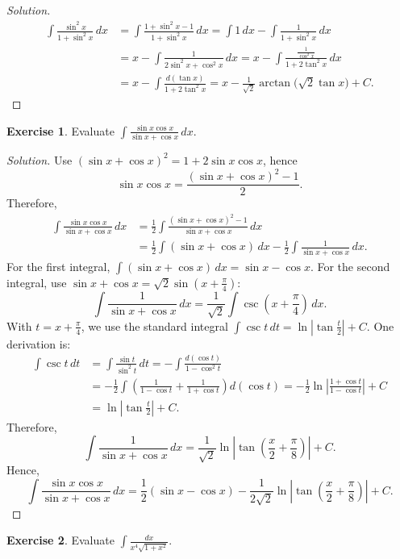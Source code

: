 \documentclass[11pt]{article}
\theoremstyle{definition}
\newtheorem{exercise}{Exercise}[section]
\newenvironment{solution}{\begin{proof}[Solution]}{\end{proof}}
\begin{document}
\begin{solution}
\begin{align*}
\int\frac{\sin^2 x}{1+\sin^2 x}\,dx
&=\int\frac{1+\sin^2 x-1}{1+\sin^2 x}\,dx
=\int 1\,dx-\int\frac{1}{1+\sin^2 x}\,dx \\
&=x-\int\frac{1}{2\sin^2 x+\cos^2 x}\,dx
=x-\int\frac{\frac{1}{\cos^2 x}}{1+2\tan^2 x}\,dx \\
&=x-\int\frac{d(\tan x)}{1+2\tan^2 x}
=x-\frac{1}{\sqrt{2}}\arctan\!\bigl(\sqrt{2}\tan x\bigr)+C.
\end{align*}
\end{solution}

\begin{exercise}
Evaluate $\displaystyle \int \frac{\sin x\cos x}{\sin x+\cos x}\,dx$.
\end{exercise}

\begin{solution}
Use $(\sin x+\cos x)^2=1+2\sin x\cos x$, hence
\[
\sin x\cos x=\frac{(\sin x+\cos x)^2-1}{2}.
\]
Therefore,
\begin{align*}
\int \frac{\sin x\cos x}{\sin x+\cos x}\,dx
&=\frac{1}{2}\int\frac{(\sin x+\cos x)^2-1}{\sin x+\cos x}\,dx \\
&=\frac{1}{2}\int(\sin x+\cos x)\,dx-\frac{1}{2}\int\frac{1}{\sin x+\cos x}\,dx.
\end{align*}
For the first integral, $\int(\sin x+\cos x)\,dx=\sin x-\cos x$.
For the second integral, use $\sin x+\cos x=\sqrt{2}\sin(x+\frac{\pi}{4})$:
\[
\int\frac{1}{\sin x+\cos x}\,dx
=\frac{1}{\sqrt{2}}\int \csc\!\left(x+\frac{\pi}{4}\right)\,dx.
\]
With $t=x+\frac{\pi}{4}$, we use the standard integral $\int \csc t\,dt=\ln\left|\tan\frac{t}{2}\right|+C$. One derivation is:
\begin{align*}
\int \csc t\,dt
&=\int \frac{\sin t}{\sin^2 t}\,dt
=-\int \frac{d(\cos t)}{1-\cos^2 t} \\
&=-\frac{1}{2}\int\left(\frac{1}{1-\cos t}+\frac{1}{1+\cos t}\right)d(\cos t)
=-\frac{1}{2}\ln\left|\frac{1+\cos t}{1-\cos t}\right|+C \\
&=\ln\left|\tan\frac{t}{2}\right|+C.
\end{align*}
Therefore,
\[
\int\frac{1}{\sin x+\cos x}\,dx
=\frac{1}{\sqrt{2}}\ln\left|\tan\left(\frac{x}{2}+\frac{\pi}{8}\right)\right|+C.
\]
Hence,
\[
\int \frac{\sin x\cos x}{\sin x+\cos x}\,dx
=\frac{1}{2}(\sin x-\cos x)-\frac{1}{2\sqrt{2}}\ln\left|\tan\left(\frac{x}{2}+\frac{\pi}{8}\right)\right|+C.
\]
\end{solution}

\begin{exercise}
Evaluate $\displaystyle \int \frac{dx}{x^4\sqrt{1+x^2}}$.
\end{exercise}
\end{document}
